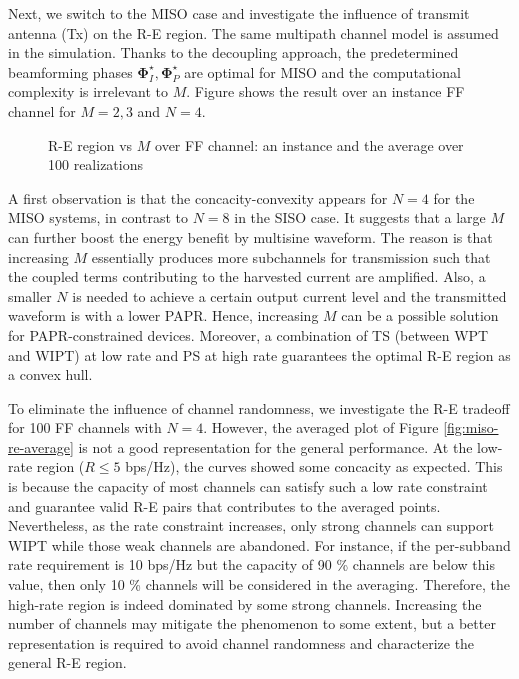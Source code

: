 Next, we switch to the MISO case and investigate the influence of transmit antenna (Tx) on the R-E region. The same multipath channel model is assumed in the simulation. Thanks to the decoupling approach, the predetermined beamforming phases ${\mathbf{\Phi }}_I^ \star ,{\mathbf{\Phi }}_P^ \star $ are optimal for MISO and the computational complexity is irrelevant to $M$. Figure \label{fig:miso-re-instance} shows the result over an instance FF channel for $M = 2,3$ and $N = 4$.

\begin{figure}[ht]
  \centering
  \caption{R-E region vs $M$ over FF channel: an instance and the average over 100 realizations}
  \label{fig:miso-re}
\end{figure} 

A first observation is that the concacity-convexity appears for $N = 4$ for the MISO systems, in contrast to $N = 8$ in the SISO case. It suggests that a large $M$ can further boost the energy benefit by multisine waveform. The reason is that increasing $M$ essentially produces more subchannels for transmission such that the coupled terms contributing to the harvested current are amplified. Also, a smaller $N$ is needed to achieve a certain output current level and the transmitted waveform is with a lower PAPR. Hence, increasing $M$ can be a possible solution for PAPR-constrained devices. Moreover, a combination of TS (between WPT and WIPT) at low rate and PS at high rate guarantees the optimal R-E region as a convex hull.

To eliminate the influence of channel randomness, we investigate the R-E tradeoff for 100 FF channels with $N = 4$. However, the averaged plot of Figure \ref{fig:miso-re-average} is not a good representation for the general performance. At the low-rate region ($R \leqslant 5$ bps/Hz), the curves showed some concacity as expected. This is because the capacity of most channels can satisfy such a low rate constraint and guarantee valid R-E pairs that contributes to the averaged points. Nevertheless, as the rate constraint increases, only strong channels can support WIPT while those weak channels are abandoned. For instance, if the per-subband rate requirement is 10 bps/Hz but the capacity of 90 \% channels are below this value, then only 10 \% channels will be considered in the averaging. Therefore, the high-rate region is indeed dominated by some strong channels. Increasing the number of channels may mitigate the phenomenon to some extent, but a better representation is required to avoid channel randomness and characterize the general R-E region.

